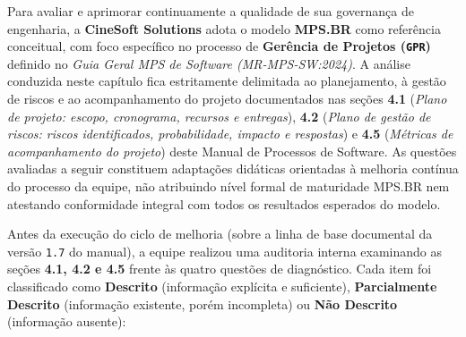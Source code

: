 


Para avaliar e aprimorar continuamente a qualidade de sua governança de engenharia, a \textbf{CineSoft Solutions} adota o modelo \textbf{MPS.BR} como referência conceitual, com foco específico no processo de \textbf{Gerência de Projetos (\texttt{GPR})} definido no \emph{Guia Geral MPS de Software (MR-MPS-SW:2024)}. A análise conduzida neste capítulo fica estritamente delimitada ao planejamento, à gestão de riscos e ao acompanhamento do projeto documentados nas seções \textbf{4.1} (\emph{Plano de projeto: escopo, cronograma, recursos e entregas}), \textbf{4.2} (\emph{Plano de gestão de riscos: riscos identificados, probabilidade, impacto e respostas}) e \textbf{4.5} (\emph{Métricas de acompanhamento do projeto}) deste Manual de Processos de Software. As questões avaliadas a seguir constituem adaptações didáticas orientadas à melhoria contínua do processo da equipe, não atribuindo nível formal de maturidade MPS.BR nem atestando conformidade integral com todos os resultados esperados do modelo.


Antes da execução do ciclo de melhoria (sobre a linha de base documental da versão \texttt{1.7} do manual), a equipe realizou uma auditoria interna examinando as seções \textbf{4.1, 4.2 e 4.5} frente às quatro questões de diagnóstico. Cada item foi classificado como \textbf{Descrito} (informação explícita e suficiente), \textbf{Parcialmente Descrito} (informação existente, porém incompleta) ou \textbf{Não Descrito} (informação ausente):

